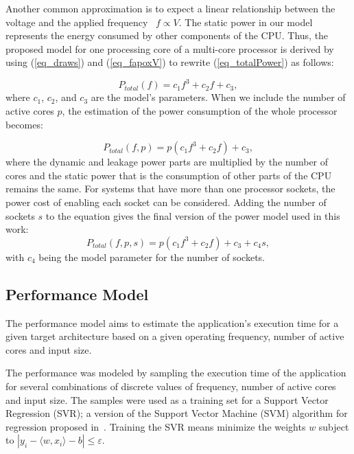 Another common approximation is to expect a linear relationship between the voltage and the applied frequency~\cite{Usman2013} $ f \propto V \label{eq_fapoxV} $. The static power in our model represents the energy consumed by other components of the CPU. Thus, the proposed model for one processing core of a multi-core processor is derived by using (\ref{eq_draws}) and (\ref{eq_fapoxV}) to rewrite (\ref{eq_totalPower}) as follows:

\begin{equation}
P_{total}(f)= c_1f^3+c_2f+c_3 \label{eq_fitting},
\end{equation}
where $c_1$, $c_2$, and $c_3$ are the model's parameters. When we include the number of active cores $p$, the estimation of the power consumption of the whole processor becomes:


\begin{equation}
P_{total}(f,p)= p(c_1f^3+c_2f)+c_3 \label{eq_power_core},
\end{equation}
where the dynamic and leakage power parts are multiplied by the number of cores and the static power that is the consumption of other parts of the CPU remains the same. For systems that have more than one processor sockets, the power cost of enabling each socket can be considered. Adding the number of sockets $s$ to the equation gives the final version of the power model used in this work:
\begin{equation}
P_{total}(f,p,s)= p(c_1f^3+c_2f)+c_3+c_4s \label{eq_power_final},
\end{equation}
with $c_4$ being the model parameter for the number of sockets.

\subsection{Performance Model} \label{sec:performancemodel}
The performance model aims to estimate the application's execution time for a given target architecture based on a given operating frequency, number of active cores and input size. 

The performance was modeled by sampling the execution time of the application for several combinations of discrete values of frequency, number of active cores and input size. The samples were used as a training set for a Support Vector Regression (SVR); a version of the Support Vector Machine (SVM) algorithm for regression proposed in~\cite{Drucker1997}. Training the SVR means minimize the weights $w$ subject to $|y_i-\langle w,x_i\rangle-b| \leq \varepsilon$.

